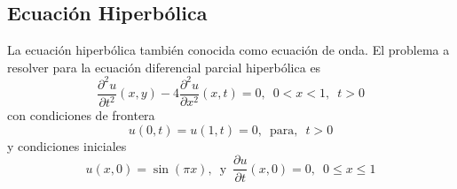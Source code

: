 \documentclass[a4paper]{article}
\begin{document}
\subsection{Ecuación Hiperbólica}
La ecuación hiperbólica también conocida como ecuación de onda. El problema a resolver para la ecuación diferencial parcial hiperbólica es 
\begin{equation} \label{eq::wave_equation}
\frac{\partial^2 u}{\partial t^2}(x,y)-4\frac{\partial ^2 u}{\partial x^2}(x,t)=0,\,\,\,0<x<1,\,\,\,t>0
\end{equation}
con condiciones de frontera 
\begin{equation}
u(0,t)=u(1,t)=0,\,\,\, \text{para, }\,\,t>0
\end{equation}
y condiciones iniciales
\begin{equation}
u(x,0)=\sin(\pi x), \,\,\, \text{y}\,\,\,\frac{\partial u}{\partial t}(x,0)=0,\,\,\, 0\leq x \leq 1
\end{equation}
\end{document}
